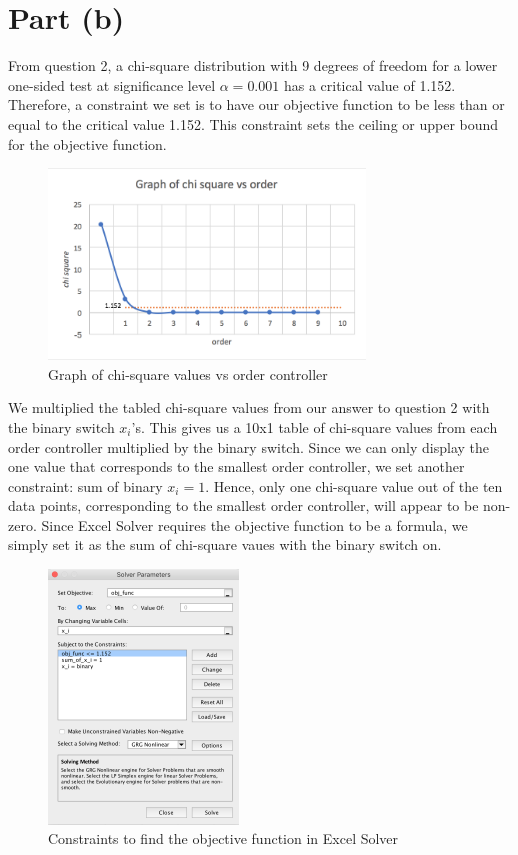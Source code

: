 \documentclass[12pt,a4paper]{article}
\begin{document}
	\section{Part (b)}
	From question 2, a chi-square distribution with 9 degrees of freedom for a lower one-sided test at significance level $\alpha = 0.001$ has a critical value of 1.152. Therefore, a constraint we set is to have our objective function to be less than or equal to the critical value 1.152. This constraint sets the ceiling or upper bound for the objective function.
	\begin{figure}[H]
		\begin{center}
			\includegraphics[width=0.75\textwidth]{chi.png}
			\caption{Graph of chi-square values vs order controller}
			\label{fig:chi}
		\end{center}
	\end{figure}
	We multiplied the tabled chi-square values from our answer to question 2 with the binary switch $x_i$'s. This gives us a 10x1 table of chi-square values from each order controller multiplied by the binary switch. Since we can only display the one value that corresponds to the smallest order controller, we set another constraint: sum of binary $x_i = 1$. Hence, only one chi-square value out of the ten data points, corresponding to the smallest order controller, will appear to be non-zero. Since Excel Solver requires the objective function to be a formula, we simply set it as the sum of chi-square vaues with the binary switch on.
	\begin{figure}[H]
		\begin{center}
			\includegraphics[width=0.45\textwidth]{constraints.png}
			\caption{Constraints to find the objective function in Excel Solver}
			\label{fig:constraints}
		\end{center}
	\end{figure}
\end{document}
